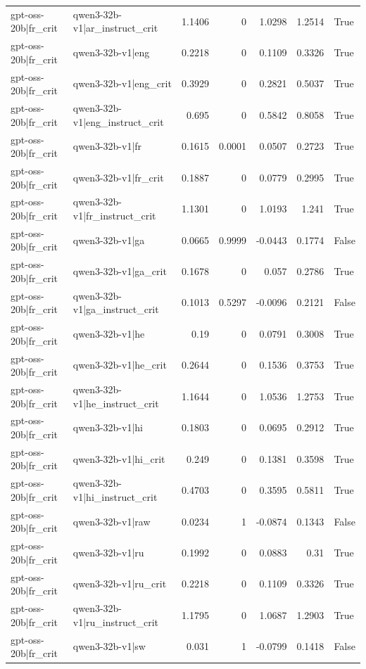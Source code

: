 \begin{table}
\begin{tabular}{l l r r r r l}
gpt-oss-20b|fr_crit & qwen3-32b-v1|ar_instruct_crit & 1.1406 & 0 & 1.0298 & 1.2514 & True \\
gpt-oss-20b|fr_crit & qwen3-32b-v1|eng & 0.2218 & 0 & 0.1109 & 0.3326 & True \\
gpt-oss-20b|fr_crit & qwen3-32b-v1|eng_crit & 0.3929 & 0 & 0.2821 & 0.5037 & True \\
gpt-oss-20b|fr_crit & qwen3-32b-v1|eng_instruct_crit & 0.695 & 0 & 0.5842 & 0.8058 & True \\
gpt-oss-20b|fr_crit & qwen3-32b-v1|fr & 0.1615 & 0.0001 & 0.0507 & 0.2723 & True \\
gpt-oss-20b|fr_crit & qwen3-32b-v1|fr_crit & 0.1887 & 0 & 0.0779 & 0.2995 & True \\
gpt-oss-20b|fr_crit & qwen3-32b-v1|fr_instruct_crit & 1.1301 & 0 & 1.0193 & 1.241 & True \\
gpt-oss-20b|fr_crit & qwen3-32b-v1|ga & 0.0665 & 0.9999 & -0.0443 & 0.1774 & False \\
gpt-oss-20b|fr_crit & qwen3-32b-v1|ga_crit & 0.1678 & 0 & 0.057 & 0.2786 & True \\
gpt-oss-20b|fr_crit & qwen3-32b-v1|ga_instruct_crit & 0.1013 & 0.5297 & -0.0096 & 0.2121 & False \\
gpt-oss-20b|fr_crit & qwen3-32b-v1|he & 0.19 & 0 & 0.0791 & 0.3008 & True \\
gpt-oss-20b|fr_crit & qwen3-32b-v1|he_crit & 0.2644 & 0 & 0.1536 & 0.3753 & True \\
gpt-oss-20b|fr_crit & qwen3-32b-v1|he_instruct_crit & 1.1644 & 0 & 1.0536 & 1.2753 & True \\
gpt-oss-20b|fr_crit & qwen3-32b-v1|hi & 0.1803 & 0 & 0.0695 & 0.2912 & True \\
gpt-oss-20b|fr_crit & qwen3-32b-v1|hi_crit & 0.249 & 0 & 0.1381 & 0.3598 & True \\
gpt-oss-20b|fr_crit & qwen3-32b-v1|hi_instruct_crit & 0.4703 & 0 & 0.3595 & 0.5811 & True \\
gpt-oss-20b|fr_crit & qwen3-32b-v1|raw & 0.0234 & 1 & -0.0874 & 0.1343 & False \\
gpt-oss-20b|fr_crit & qwen3-32b-v1|ru & 0.1992 & 0 & 0.0883 & 0.31 & True \\
gpt-oss-20b|fr_crit & qwen3-32b-v1|ru_crit & 0.2218 & 0 & 0.1109 & 0.3326 & True \\
gpt-oss-20b|fr_crit & qwen3-32b-v1|ru_instruct_crit & 1.1795 & 0 & 1.0687 & 1.2903 & True \\
gpt-oss-20b|fr_crit & qwen3-32b-v1|sw & 0.031 & 1 & -0.0799 & 0.1418 & False \\

\end{tabular}
\end{table}
